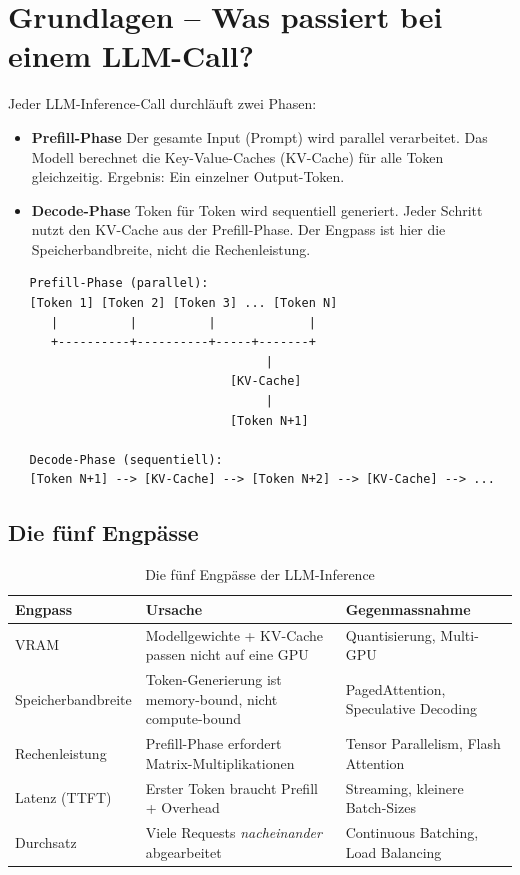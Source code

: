 \section{Grundlagen -- Was passiert bei einem LLM-Call?}

Jeder LLM-Inference-Call durchläuft zwei Phasen:

\begin{itemize}

    \item \textbf{Prefill-Phase} Der gesamte Input (Prompt) wird parallel verarbeitet. Das Modell berechnet die Key-Value-Caches (KV-Cache) für alle Token gleichzeitig. Ergebnis: Ein einzelner Output-Token.
    \item \textbf{Decode-Phase} Token für Token wird sequentiell generiert. Jeder Schritt nutzt den KV-Cache aus der Prefill-Phase. Der Engpass ist hier die Speicherbandbreite, nicht die Rechenleistung.
\end{itemize}

\begin{verbatim}
   Prefill-Phase (parallel):
   [Token 1] [Token 2] [Token 3] ... [Token N]
      |          |          |             |
      +----------+----------+-----+-------+
                                    |
                               [KV-Cache]
                                    |
                               [Token N+1]
   
   Decode-Phase (sequentiell):
   [Token N+1] --> [KV-Cache] --> [Token N+2] --> [KV-Cache] --> ...
\end{verbatim}

\subsection{Die fünf Engpässe}

\begin{table}[H]
\centering
\begin{tabularx}{\linewidth}{lXl}
\toprule
\textbf{Engpass} & \textbf{Ursache} & \textbf{Gegenmassnahme} \\
\midrule
VRAM & Modellgewichte + KV-Cache passen nicht auf eine GPU & Quantisierung, Multi-GPU \\
Speicherbandbreite & Token-Generierung ist memory-bound, nicht compute-bound & PagedAttention, Speculative Decoding \\
Rechenleistung & Prefill-Phase erfordert Matrix-Multiplikationen & Tensor Parallelism, Flash Attention \\
Latenz (TTFT) & Erster Token braucht Prefill + Overhead & Streaming, kleinere Batch-Sizes \\
Durchsatz & Viele Requests \textit{nacheinander} abgearbeitet & Continuous Batching, Load Balancing \\
\bottomrule
\end{tabularx}
\caption{Die fünf Engpässe der LLM-Inference}
\protect\label{tab:inference-engpaesse}
\end{table}


